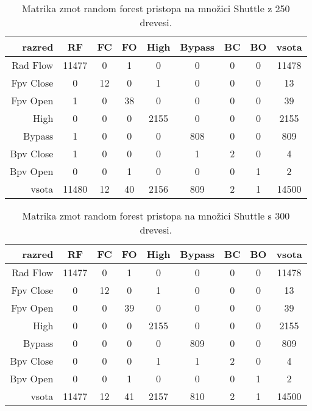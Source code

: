 \begin{table}[H]
    \centering
    \begin{tabular}{||rcccccccc||}
        \hline
        razred    & RF    & FC & FO & High & Bypass & BC & BO & vsota \\ \hline
        Rad Flow  & 11477 & 0  & 1  & 0    & 0      & 0  & 0  & 11478 \\ \hline
        Fpv Close & 0     & 12 & 0  & 1    & 0      & 0  & 0  & 13    \\ \hline
        Fpv Open  & 1     & 0  & 38 & 0    & 0      & 0  & 0  & 39    \\ \hline
        High      & 0     & 0  & 0  & 2155 & 0      & 0  & 0  & 2155  \\ \hline
        Bypass    & 1     & 0  & 0  & 0    & 808    & 0  & 0  & 809   \\ \hline
        Bpv Close & 1     & 0  & 0  & 0    & 1      & 2  & 0  & 4     \\ \hline
        Bpv Open  & 0     & 0  & 1  & 0    & 0      & 0  & 1  & 2     \\ \hline
        vsota     & 11480 & 12 & 40 & 2156 & 809    & 2  & 1  & 14500 \\ \hline
    \end{tabular}
    \caption{Matrika zmot random forest pristopa na množici Shuttle z 250 drevesi.}
    \label{tab:rforest_shuttle_cm_2}
\end{table}

\begin{table}[H]
    \centering
    \begin{tabular}{||rcccccccc||}
        \hline
        razred    & RF    & FC & FO & High & Bypass & BC & BO & vsota \\ \hline
        Rad Flow  & 11477 & 0  & 1  & 0    & 0      & 0  & 0  & 11478 \\ \hline
        Fpv Close & 0     & 12 & 0  & 1    & 0      & 0  & 0  & 13    \\ \hline
        Fpv Open  & 0     & 0  & 39 & 0    & 0      & 0  & 0  & 39    \\ \hline
        High      & 0     & 0  & 0  & 2155 & 0      & 0  & 0  & 2155  \\ \hline
        Bypass    & 0     & 0  & 0  & 0    & 809    & 0  & 0  & 809   \\ \hline
        Bpv Close & 0     & 0  & 0  & 1    & 1      & 2  & 0  & 4     \\ \hline
        Bpv Open  & 0     & 0  & 1  & 0    & 0      & 0  & 1  & 2     \\ \hline
        vsota     & 11477 & 12 & 41 & 2157 & 810    & 2  & 1  & 14500 \\ \hline
    \end{tabular}
    \caption{Matrika zmot random forest pristopa na množici Shuttle s 300 drevesi.}
    \label{tab:rforest_shuttle_cm_3}
\end{table}